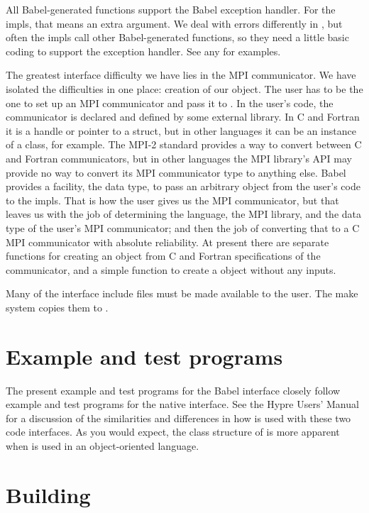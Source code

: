 All Babel-generated functions support the Babel exception handler.
For the impls, that means an extra argument.  We deal with errors
differently in \hypre{}, but often the impls call other
Babel-generated functions, so they need a little basic coding to
support the exception handler.  See any  for examples.

The greatest interface difficulty we have lies in the MPI
communicator.  We have isolated the difficulties in one place:
creation of our  object.  The user has to be the
one to set up an MPI communicator and pass it to \hypre{}.  In the
user's code, the communicator is declared and defined by some external
library.  In C and Fortran it is a handle or pointer to a struct, but
in other languages it can be an instance of a class, for example.  The
MPI-2 standard provides a way to convert between C and Fortran
communicators, but in other languages the MPI library's API may
provide no way to convert its MPI communicator type to anything else.
Babel provides a facility, the  data type, to pass an
arbitrary object from the user's code to the impls.  That is how the
user gives us the MPI communicator, but that leaves us with the job of
determining the language, the MPI library, and the data type of the
user's MPI communicator; and then the job of converting that to a C
MPI communicator with absolute reliability.  At present there are
separate functions for creating an  object from
C and Fortran specifications of the communicator, and a simple
function to create a  object without any inputs.

Many of the \hypre{} interface include files must be made available to
the user.  The make system copies them to .

\section{Example and test programs}

The present example and test programs for the Babel interface closely
follow example and test programs for the native interface.  See the
Hypre Users' Manual for a discussion of the similarities and differences in
how \hypre{} is used with these two code interfaces.  As you would
expect, the class structure of \hypre{} is more apparent when \hypre{}
is used in an object-oriented language.

\section{Building}

